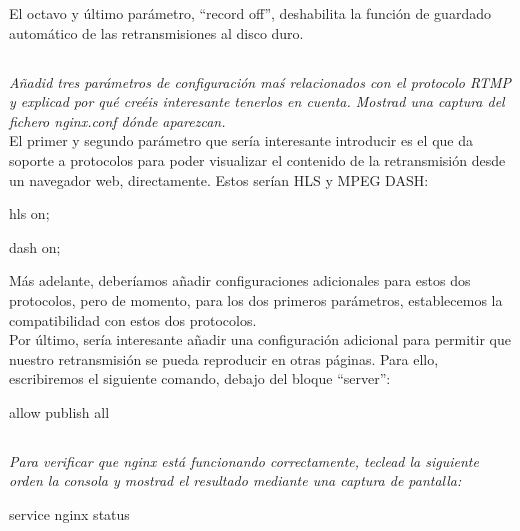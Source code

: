 \documentclass[spanish]{article}
\begin{document}
El octavo y último parámetro, ``record off'', deshabilita la
función de guardado automático de las retransmisiones al
disco duro.

\subsection{}

\textit{Añadid tres parámetros de configuración maś
relacionados con el protocolo RTMP y explicad por qué creéis
interesante tenerlos en cuenta. Mostrad una captura del
fichero nginx.conf dónde aparezcan.}\\

El primer y segundo parámetro que sería interesante
introducir es el que da soporte a protocolos para poder visualizar el
contenido de la retransmisión desde un navegador web,
directamente. Estos serían HLS y MPEG DASH:

\begin{center}
hls on;

dash on;\\
\end{center}

Más adelante, deberíamos añadir configuraciones adicionales
para estos dos protocolos, pero de momento, para los dos
primeros parámetros, establecemos la compatibilidad con
estos dos protocolos.\\

Por último, sería interesante añadir una configuración
adicional para permitir que nuestro retransmisión se pueda
reproducir en otras páginas. Para ello, escribiremos el
siguiente comando, debajo del bloque ``server'':

\begin{center}
allow publish all
\end{center}

\subsection{}

\textit{Para verificar que nginx está funcionando
correctamente, teclead la siguiente orden la consola y
mostrad el resultado mediante una captura de pantalla:}

\begin{center}
service nginx status
\end{center}
\end{document}

